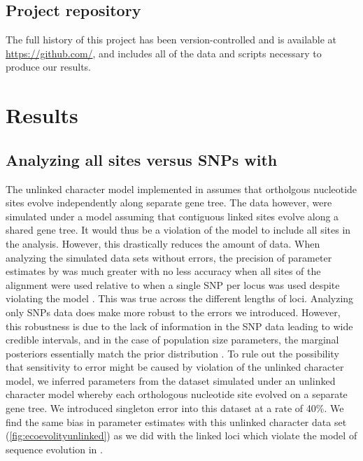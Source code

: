 \subsection{Project repository}
The full history of this project has been version-controlled and is available
at
\url{https://github.com/},
and includes
all of the data and scripts necessary to produce our results.


\section{Results}

\subsection{Analyzing all sites versus SNPs with \ecoevolity}

The unlinked character model implemented in \ecoevolity assumes that ortholgous 
nucleotide sites evolve independently along separate gene tree. The data however, were
simulated under a model assuming that contiguous linked sites evolve along a shared 
gene tree. It would thus be a violation of the \ecoevolity model to include all
sites in the analysis. However, this drastically reduces the amount of data.    
When analyzing the simulated data sets without errors, the precision of
parameter estimates by \ecoevolity was much greater with no less accuracy 
when all sites of the alignment were used relative to when a single SNP per 
locus was used despite violating the model \mainfigsp. This was true across the 
different lengths of loci.
Analyzing only SNPs data does make \ecoevolity more robust to the errors
we introduced.
However, this robustness is due to the lack of information in the
SNP data leading to wide credible intervals, and in the case of
population size parameters, the marginal posteriors essentially
match the prior distribution \thetafigsp.
To rule out the possibility that sensitivity to error might be caused by
violation of the unlinked character model, we inferred parameters from the 
dataset simulated under an unlinked character model whereby each orthologous
nucleotide site evolved on a separate gene tree. We introduced singleton error 
into this dataset at a rate of 40\%. We find the same bias in parameter estimates
with this unlinked character data set (\cref{fig:ecoevolityunlinked}) as we did 
with the linked loci which violate the model of sequence evolution in 
\ecoevolity \timefigsp.



